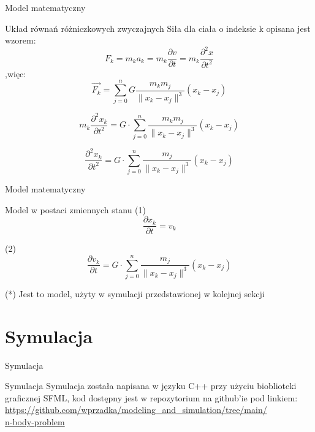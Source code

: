 \documentclass{beamer}
\begin{document}
\begin{frame}{Model matematyczny}
    \begin{block}{Układ równań różniczkowych zwyczajnych}
        Siła dla ciała o indeksie k opisana jest wzorem:
        $$ F_{k} 
        = m_{k} a_{k} 
        = m_{k} \frac{\partial v}{\partial t} 
        = m_{k} \frac{\partial^2 x}{\partial t^2} $$
        \qquad\qquad\qquad\qquad\qquad ,więc:
        $$ \vec{F_{k}}
        = \sum_{j = 0}^{n} G \frac{ m_{k} m_{j} }{ \| x_{k} - x_{j} \|^3 }(x_{k} - x_{j})$$
        
        $$ m_{k} \frac{\partial^2 x_{k}}{\partial t^2}
        = G\cdot \sum_{j = 0}^{n} \frac{ m_{k} m_{j} }{ \| x_{k} - x_{j} \|^3 }(x_{k} - x_{j})$$
        
        $$ \frac{\partial^2 x_{k}}{\partial t^2}
        = G\cdot \sum_{j = 0}^{n} \frac{ m_{j} }{ \| x_{k} - x_{j} \|^3 }(x_{k} - x_{j})$$
    \end{block}
\end{frame}

\begin{frame}{Model matematyczny}
    \begin{block}{Model w postaci zmiennych stanu}
        (1) $$ \frac{\partial x_{k}}{\partial t} = v_{k}$$
    
        (2) $$ \frac{\partial v_{k}}{\partial t}
        = G\cdot \sum_{j = 0}^{n} 
        \frac{ m_{j} }{ \| x_{k} - x_{j} \|^3 }
        (x_{k} - x_{j})$$
    \end{block}
    \begin{block}{(*)}
        Jest to model, użyty w symulacji przedstawionej w kolejnej sekcji    
    \end{block}
\end{frame}

\section{Symulacja}

\begin{frame}{Symulacja}
    \begin{block}{Symulacja}
        Symulacja została napisana w języku C++ przy użyciu bioblioteki graficznej SFML, kod dostępny jest w repozytorium na github'ie pod linkiem:\\
        \href{https://github.com/wprzadka/modeling_and_simulation/tree/main/n-body-problem}
        {https://github.com/wprzadka/modeling\_and\_simulation/tree/main/\\n-body-problem}
    \end{block}
\end{frame}
\end{document}
